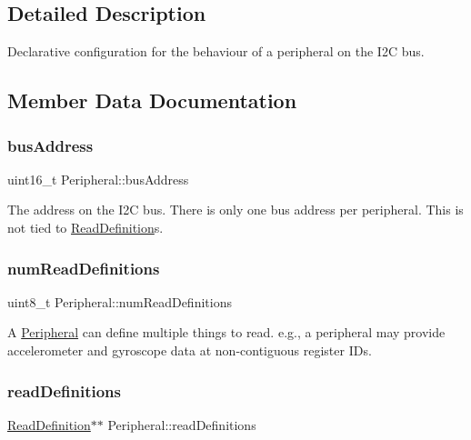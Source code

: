 \subsection{Detailed Description}
Declarative configuration for the behaviour of a peripheral on the I2C bus. 

\subsection{Member Data Documentation}
\mbox{\label{struct_peripheral_aeb9b037f7be4b84e967382c046077046}} 
\subsubsection{\texorpdfstring{bus\+Address}{busAddress}}
{\footnotesize\ttfamily uint16\+\_\+t Peripheral\+::bus\+Address}

The address on the I2C bus. There is only one bus address per peripheral. This is not tied to {\ttfamily \mbox{\hyperlink{struct_read_definition}{Read\+Definition}}}s. \mbox{\label{struct_peripheral_ae8a8523c12a7df87f2a0ebbce23658fe}} 
\subsubsection{\texorpdfstring{num\+Read\+Definitions}{numReadDefinitions}}
{\footnotesize\ttfamily uint8\+\_\+t Peripheral\+::num\+Read\+Definitions}

A \mbox{\hyperlink{struct_peripheral}{Peripheral}} can define multiple things to read. e.\+g., a peripheral may provide accelerometer and gyroscope data at non-\/contiguous register I\+Ds. \mbox{\label{struct_peripheral_a140bc115ee96fd0ab21ab1127beac7af}} 
\subsubsection{\texorpdfstring{read\+Definitions}{readDefinitions}}
{\footnotesize\ttfamily \mbox{\hyperlink{struct_read_definition}{Read\+Definition}}$\ast$$\ast$ Peripheral\+::read\+Definitions}

